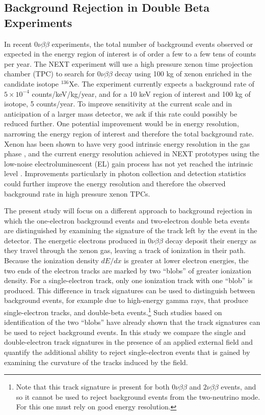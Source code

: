 \documentclass{JINST}
\begin{document}
\subsection{Background Rejection in Double Beta Experiments}
In recent $0\nu\beta\beta$ experiments, the total number of background events observed or expected in the energy 
region of interest is of order a few to a few tens of counts per year.  The NEXT experiment will use a high pressure xenon time projection chamber (TPC) to search for $0\nu\beta\beta$ decay
using 100 kg of xenon enriched in the candidate isotope $^{136}$Xe.  The experiment currently 
expects a background rate of $5 \times 10^{-4}$ counts/keV/kg/year, and for a 10 keV region of interest and 100 kg of 
isotope, 5 counts/year.  To improve sensitivity at the current scale and in anticipation of a larger mass detector, we ask
if this rate could possibly be reduced further.  One potential improvement would be in energy resolution, narrowing the
energy region of interest and therefore the total background rate.  Xenon has been shown to have very good intrinsic 
energy resolution in the gas phase \cite{Bolotnikov}, and the current energy resolution achieved in NEXT prototypes 
using the low-noise electroluminescent (EL) gain process has not yet reached the intrinsic level \cite{NEXT_2013}.  Improvements particularly in photon collection and detection statistics could further improve the energy resolution and therefore the observed background rate in high pressure xenon TPCs.  

The present study will focus on a different approach to background rejection in which the one-electron background events 
and two-electron double beta events are distinguished by examining the signature of the track left by the event in the 
detector.  The energetic electrons produced in $0\nu\beta\beta$ decay deposit their energy as they travel through the 
xenon gas, leaving a track of ionization in their path.  Because the ionization density $dE/dx$ is greater at lower electron 
energies, the two ends of the electron tracks are marked by two ``blobs'' of greater ionization density.  For a 
single-electron track, only one ionization track with one ``blob'' is produced.  This difference in track signatures can be 
used to distinguish between background events, for example due to high-energy gamma rays, that produce 
single-electron tracks, and double-beta events.\footnote{Note that this track signature is present for both 
$0\nu\beta\beta$ and $2\nu\beta\beta$ events, and so it cannot be used to reject background events from the 
two-neutrino mode.  For this one must rely on good energy resolution.}  Such studies based on identification of the two 
``blobs'' have already shown that the track signatures can be used to reject background events.  In this study we compare 
the single and double-electron track signatures in the presence of an applied external field and quantify the additional 
ability to reject single-electron events that is gained by examining the curvature of the tracks induced by the field.
\end{document}
